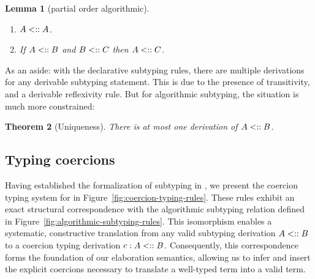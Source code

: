 \documentclass[pdflatex,sn-mathphys-num]{sn-jnl}%
\theoremstyle{thmstyleone}%
\newtheorem{theorem}{Theorem}%
\newtheorem{lemma}[theorem]{Lemma}%
\theoremstyle{thmstyletwo}%
\theoremstyle{thmstylethree}%
\begin{document}
\begin{lemma}[partial order algorithmic]
  \

  \begin{enumerate}
\item  $A \mathrel{<::} A$.
\item  If $A \mathrel{<::} B$ and $B \mathrel{<::} C$ then $A \mathrel{<::} C$.
  \end{enumerate}
  \end{lemma}

\noindent As an aside: with the declarative subtyping rules, there are
multiple derivations for any derivable subtyping statement.  This is
due to the presence of transitivity, and a derivable reflexivity rule.
But for algorithmic subtyping, the situation is much more constrained:

\begin{theorem}[Uniqueness]
  \label{thm:uniqueness}
  There is at most one derivation of $A \mathrel{<::} B$.
\end{theorem}

\subsection{Typing coercions}
\label{sec:typing-coercions}

Having established the formalization of subtyping in \lcataSub, we present the coercion typing system for \lcata in Figure~\ref{fig:coercion-typing-rules}.
These rules exhibit an exact structural correspondence with the algorithmic subtyping relation defined in Figure~\ref{fig:algorithmic-subtyping-rules}.
This isomorphism enables a systematic, constructive translation from any valid subtyping derivation $A \mathrel{<::} B$ to a coercion typing derivation $c : A \mathrel{<::} B$.
Consequently, this correspondence forms the foundation of our elaboration semantics, allowing us to infer and insert the explicit coercions necessary to translate a well-typed \lcataSub term into a valid \lcata term.
\end{document}
